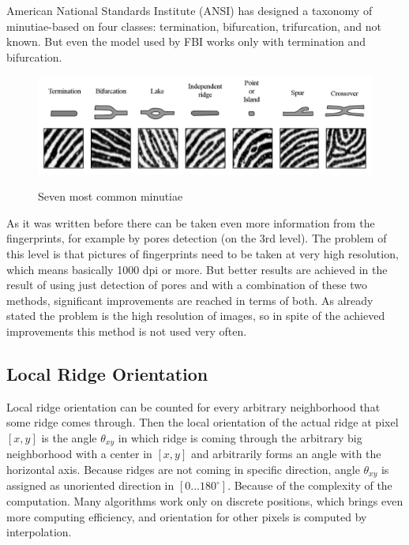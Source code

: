 American National Standards Institute (ANSI) has designed a taxonomy of minutiae-based on four classes: termination, bifurcation, trifurcation, and not known. But even the model used by FBI works only with termination and bifurcation. \cite{maltoni2009handbook}

\begin{figure}[H]
    \centering
        {\includegraphics[width=\linewidth]{obrazky-figures/minutiae.png}}\\
        \caption{Seven most common minutiae\ \cite{maltoni2009handbook}}
        \label{fig:minutiae}
\end{figure}

As it was written before there can be taken even more information from the fingerprints, for example by pores detection (on the 3rd level). The problem of this level is that pictures of fingerprints need to be taken at very high resolution, which means basically 1000 dpi or more. But better results are achieved in the result of using just detection of pores and with a combination of these two methods, significant improvements are reached in terms of both. As already stated the problem is the high resolution of images, so in spite of the achieved improvements this method is not used very often. \cite{jain2007handbook} \cite{naser}

\subsection{Local Ridge Orientation}

Local ridge orientation can be counted for every arbitrary neighborhood that some ridge comes through. Then the local orientation of the actual ridge at pixel $[x,y]$ is the angle $\theta_{xy}$ in which ridge is coming through the arbitrary big neighborhood with a center in $[x,y]$ and arbitrarily forms an angle with the horizontal axis. Because ridges are not coming in specific direction, angle $\theta_{xy}$ is assigned as unoriented direction in $\left[0 ... 180^{\circ}\right]$. Because of the complexity of the computation. Many algorithms work only on discrete positions, which brings even more computing efficiency, and orientation for other pixels is computed by interpolation. \cite{hong2004fingerprint} \cite{hong1999classification}

